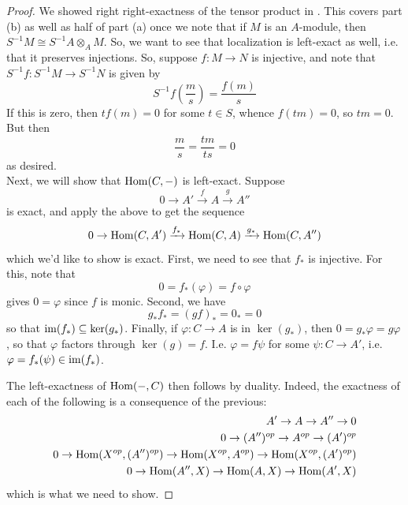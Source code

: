 \documentclass[12pt]{exam}
\begin{document}
\begin{proof}
	We showed right right-exactness of the tensor product in . This covers part (b) as well as half of part (a) once we note that if $M$ is an $A$-module, then $S^{-1}M \cong S^{-1}A \otimes_A M$. So, we want to see that localization is left-exact as well, i.e. that it preserves injections. So, suppose $f : M \to N$ is injective, and note that $S^{-1}f : S^{-1}M \to S^{-1}N$ is given by
	\[ S^{-1}f\left(\frac{m}s\right) = \frac{f(m)}s \]
	If this is zero, then $tf(m) = 0$ for some $t \in S$, whence $f(tm) = 0$, so $tm = 0$. But then
	\[ \frac{m}s = \frac{tm}{ts} = 0 \]
	as desired. \\
	
	Next, we will show that $\operatorname{Hom}(C,-)$ is left-exact. Suppose
	\[ 0 \to A' \xrightarrow{f} A \xrightarrow{g} A'' \]
	is exact, and apply the above to get the sequence
	\[ 0 \to \operatorname{Hom}(C,A') \xrightarrow{f_\ast} \operatorname{Hom}(C,A) \xrightarrow{g_\ast} \operatorname{Hom}(C,A'') \]
	which we'd like to show is exact. First, we need to see that $f_\ast$ is injective. For this, note that
	\[ 0 = f_\ast(\varphi) = f \circ \varphi \]
	gives $0 = \varphi$ since $f$ is monic. Second, we have
	\[ g_\ast f_\ast = (gf)_\ast = 0_\ast = 0 \]
	so that $\operatorname{im}(f_\ast) \subseteq \ker(g_\ast)$. Finally, if $\varphi : C \to A$ is in $\ker(g_\ast)$, then $0 = g_\ast\varphi = g\varphi$, so that $\varphi$ factors through $\ker(g) = f$. I.e. $\varphi = f\psi$ for some $\psi : C \to A'$, i.e. $\varphi = f_\ast(\psi) \in \operatorname{im}(f_\ast)$.
	
	The left-exactness of $\operatorname{Hom}(-,C)$ then follows by duality. Indeed, the exactness of each of the following is a consequence of the previous:
	\begin{align*}
		A' \to A \to A'' \to 0 \\
		0 \to (A'')^{op} \to A^{op} \to (A')^{op} \\
		0 \to \operatorname{Hom}(X^{op},(A'')^{op}) \to \operatorname{Hom}(X^{op},A^{op}) \to \operatorname{Hom}(X^{op},(A')^{op}) \\
		0 \to \operatorname{Hom}(A'',X) \to \operatorname{Hom}(A,X) \to \operatorname{Hom}(A',X)
	\end{align*}
	which is what we need to show.
\end{proof}
\end{document}

